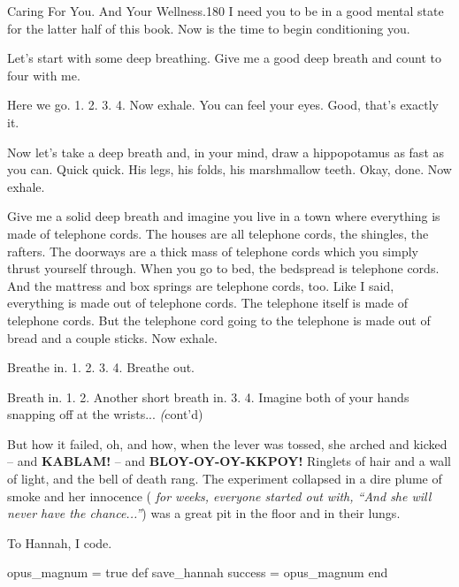 \documentclass[12pt,twoside]{report}
\begin{document}
	\begin{sidebar}{Caring For You. And Your Wellness.}{180}
		I need you to be in a good mental state for the latter half of this book. Now is the time to begin conditioning you.\vspace{6pt}
		
		Let's start with some deep breathing. Give me a good deep breath and count to four with me.\vspace{6pt}

		Here we go. 1. 2. 3. 4. Now exhale. You can feel your eyes. Good, that's exactly it.\vspace{6pt}

		Now let's take a deep breath and, in your mind, draw a hippopotamus as fast as you can. Quick quick. His legs, his folds, his marshmallow teeth. Okay, done. Now exhale.\vspace{6pt}
		
		Give me a solid deep breath and imagine you live in a town where everything is made of telephone cords. The houses are all telephone cords, the shingles, the rafters. The doorways are a thick mass of telephone cords which you simply thrust yourself through. When you go to bed, the bedspread is telephone cords. And the mattress and box springs are telephone cords, too. Like I said, everything is made out of telephone cords. The telephone itself is made of telephone cords. But the telephone cord going to the telephone is made out of bread and a couple sticks. Now exhale.\vspace{6pt}
		
		Breathe in. 1. 2. 3. 4. Breathe out.\vspace{6pt}

		Breath in. 1. 2. Another short breath in. 3. 4. Imagine both of your hands snapping off at the wrists... \textit(cont'd)\vspace{6pt}
	\end{sidebar}

But how it failed, oh, and how, when the lever was tossed, she arched
and kicked -- and {\bf KABLAM!} -- and {\bf BLOY-OY-OY-KKPOY!}
Ringlets of hair and a wall of light, and the bell of death rang.  The
experiment collapsed in a dire plume of smoke and her innocence ({\em
  for weeks, everyone started out with, ``And she will never have the
  chance...''}) was a great pit in the floor and in their lungs.

To Hannah, I code.


\begin{rubycode}

 opus_magnum = true
 def save_hannah
   success = opus_magnum
 end

\end{rubycode}
\end{document}
